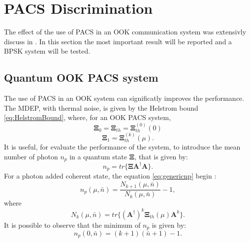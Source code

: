 \section{PACS Discrimination}
    The effect of the use of PACS in an OOK communication system was extensivly discuss in
    \cite{PACSDisc}. In this section the most important result will be reported and a BPSK
    system will be tested.

    \subsection{Quantum OOK PACS system}
    The use of PACS in an OOK system can significatly improves the performance. The MDEP, with
    thermal noise, is given by the Helstrom bound \ref{eq:HelstromBound}, where, for an OOK PACS
    system,
    \begin{equation}
        \pmb{\Xi}_0 =  \pmb{\Xi}_{th} = \pmb{\Xi}_{th}^{(0)}(0)
    \end{equation}
    \begin{equation*}
        \pmb{\Xi}_1 =  \pmb{\Xi}_{th}^{(k)}(\mu).
    \end{equation*}
    It is useful, for evaluate the performance of the system, to introduce the mean number
    of photon $n_p$ in a quantum state $\pmb{\Xi}$, that is given by:
    \begin{equation}
        n_p = tr\{\pmb{\Xi}\pmb{A}^\dagger\pmb{A}\}.
        \label{eq:genericnp}
    \end{equation}
    For a photon added coherent state, the equation \ref{eq:genericnp} begin \cite{PACSDisc}:
    \begin{equation}
        n_p(\mu,\bar{n}) = \frac{N_{k+1}(\mu,\bar{n})}{N_k(\mu,\bar{n})}-1,
        \label{eq:np}
    \end{equation}
    where
    \begin{equation}
        N_k(\mu,\bar{n}) = tr\{(\pmb{A}^\dagger)^k \pmb{\Xi}_{th}(\mu) \pmb{A}^k\}.
    \end{equation}
    It is possible to observe that the minimum of $n_p$ is given by:
    \begin{equation}
        n_p(0,\bar{n}) = (k+1)(\bar{n}+1)-1.
    \end{equation}

